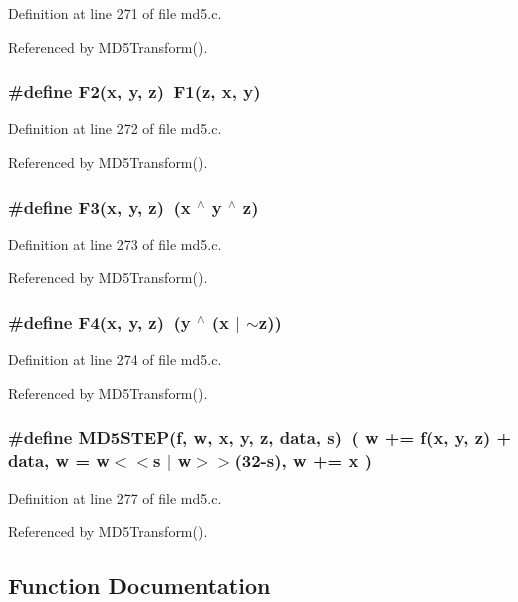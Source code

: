 Definition at line 271 of file md5.c.

Referenced by MD5Transform().
\subsubsection{\setlength{\rightskip}{0pt plus 5cm}\#define F2(x, y, z)\ F1(z, x, y)}\label{md5_8c_a1}




Definition at line 272 of file md5.c.

Referenced by MD5Transform().
\subsubsection{\setlength{\rightskip}{0pt plus 5cm}\#define F3(x, y, z)\ (x $^\wedge$ y $^\wedge$ z)}\label{md5_8c_a2}




Definition at line 273 of file md5.c.

Referenced by MD5Transform().
\subsubsection{\setlength{\rightskip}{0pt plus 5cm}\#define F4(x, y, z)\ (y $^\wedge$ (x $|$ $\sim$z))}\label{md5_8c_a3}




Definition at line 274 of file md5.c.

Referenced by MD5Transform().
\subsubsection{\setlength{\rightskip}{0pt plus 5cm}\#define MD5STEP(f, w, x, y, z, data, s)\ ( w += f(x, y, z) + data,  w = w$<$$<$s $|$ w$>$$>$(32-s),  w += x )}\label{md5_8c_a4}




Definition at line 277 of file md5.c.

Referenced by MD5Transform().

\subsection{Function Documentation}
